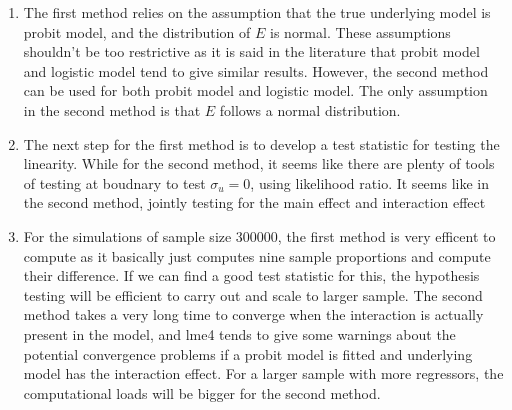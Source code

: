 \documentclass[]{article}
\begin{document}
\begin{enumerate}
\item The first method relies on the assumption that the true underlying model is probit model, and the distribution of $E$ is normal. These assumptions shouldn't be too restrictive as it is said in the literature that probit model and logistic model tend to give similar results. However, the second method can be used for both probit model and logistic model. The only assumption in the second method is that $E$ follows a normal distribution.
\item The next step for the first method is to develop a test statistic for testing the linearity. While for the second method, it seems like there are plenty of tools of testing at boudnary to test $\sigma_u = 0$, using likelihood ratio. It seems like in the second method, jointly testing for the main effect and interaction effect 
\item For the simulations of sample size 300000, the first method is very efficent to compute as it basically just computes nine sample proportions and compute their difference. If we can find a good test statistic for this, the hypothesis testing will be efficient to carry out and scale to larger sample. The second method takes a very long time to converge when the interaction is actually present in the model, and lme4 tends to give some warnings about the potential convergence problems if a probit model is fitted and underlying model has the interaction effect. For a larger sample with more regressors, the computational loads will be bigger for the second method.

\end{enumerate}
\end{document}
